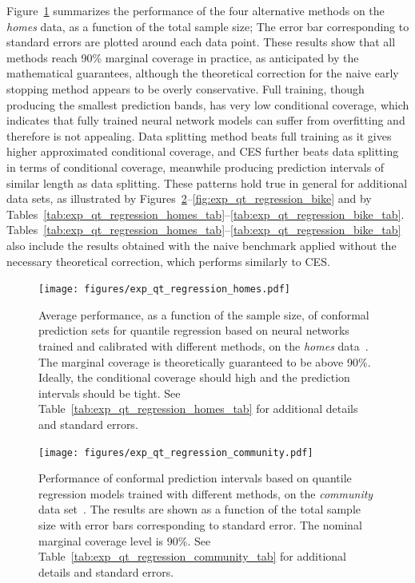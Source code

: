 Figure~\ref{fig:exp_qt_regression_homes} summarizes the performance of the four alternative methods on the {\em homes} data, as a function of the total sample size; The error bar corresponding to standard errors are plotted around each data point. These results show that all methods reach 90\% marginal coverage in practice, as anticipated by the mathematical guarantees, although the theoretical correction for the naive early stopping method appears to be overly conservative. Full training, though producing the smallest prediction bands, has very low conditional coverage, which indicates that fully trained neural network models can suffer from overfitting and therefore is not appealing. Data splitting method beats full training as it gives higher approximated conditional coverage, and CES further beats data splitting in terms of conditional coverage, meanwhile producing prediction intervals of similar length as data splitting. These patterns hold true in general for additional data sets, as illustrated by Figures~\ref{fig:exp_qt_regression_community}--\ref{fig:exp_qt_regression_bike} and by Tables~\ref{tab:exp_qt_regression_homes_tab}--\ref{tab:exp_qt_regression_bike_tab}.
Tables~\ref{tab:exp_qt_regression_homes_tab}--\ref{tab:exp_qt_regression_bike_tab} also include the results obtained with the naive benchmark applied without the necessary theoretical correction, which performs similarly to CES.


\begin{figure}[!htb]
    \centering
    \texttt{[image: figures/exp\_qt\_regression\_homes.pdf]}\vspace{-0.5cm}
    \caption{Average performance, as a function of the sample size, of conformal prediction sets for quantile regression based on neural networks trained and calibrated with different methods, on the {\em homes} data~\cite{homes}. The marginal coverage is theoretically guaranteed to be above 90\%. Ideally, the conditional coverage should high and the prediction intervals should be tight. See Table~\ref{tab:exp_qt_regression_homes_tab} for additional details and standard errors.}
    \label{fig:exp_qt_regression_homes}
\end{figure}


\begin{figure}[!htb]
    \centering
    \texttt{[image: figures/exp\_qt\_regression\_community.pdf]}
    \caption{Performance of conformal prediction intervals based on quantile regression models trained with different methods, on the {\em community} data set~\cite{community}. The results are shown as a function of the total sample size with error bars corresponding to standard error. The nominal marginal coverage level is 90\%. See Table~\ref{tab:exp_qt_regression_community_tab} for additional details and standard errors.}
    \label{fig:exp_qt_regression_community}
\end{figure}

